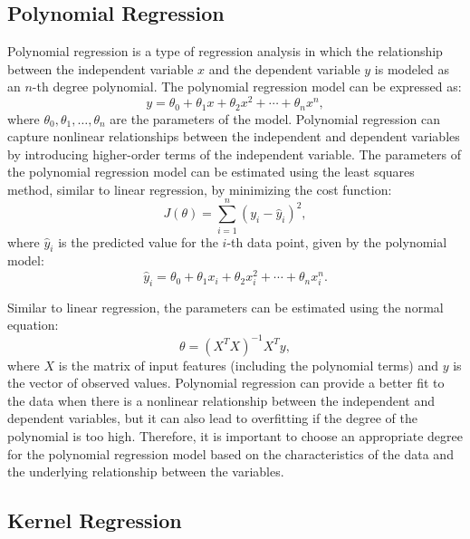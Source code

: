 \documentclass{article}
\begin{document}
\subsection{Polynomial Regression}
Polynomial regression is a type of regression analysis in which the relationship between the independent variable $x$ and the dependent variable $y$ is modeled as an $n$-th degree polynomial.
 The polynomial regression model can be expressed as:
\begin{equation}
    y = \theta_0 + \theta_1 x + \theta_2 x^2 + \cdots + \theta_n x^n,
\end{equation}
where $\theta_0, \theta_1, \ldots, \theta_n$ are the parameters of the model.
Polynomial regression can capture nonlinear relationships between the independent and dependent variables by introducing higher-order terms of the independent variable.
The parameters of the polynomial regression model can be estimated using the least squares method, similar to linear regression, by minimizing the cost function:
\begin{equation}
    J(\theta) = \sum_{i=1}^{n} (y_i - \hat{y}_i)^2,
\end{equation}
where $\hat{y}_i$ is the predicted value for the $i$-th data point, given by the polynomial model:
\begin{equation}
    \hat{y}_i = \theta_0 + \theta_1 x_i + \theta_2 x_i^2 + \cdots + \theta_n x_i^n.
\end{equation}

Similar to linear regression, the parameters can be estimated using the normal equation:
\begin{equation}
    \theta = (X^T X)^{-1} X^T y,
\end{equation}
where $X$ is the matrix of input features (including the polynomial terms) and $y$ is the vector of observed values.
Polynomial regression can provide a better fit to the data when there is a nonlinear relationship between the independent and dependent variables, but it can also lead to overfitting if the degree of the polynomial is too high. Therefore, it is important to choose an appropriate degree for the polynomial regression model based on the characteristics of the data and the underlying relationship between the variables.

\subsection{Kernel Regression}
\end{document}

